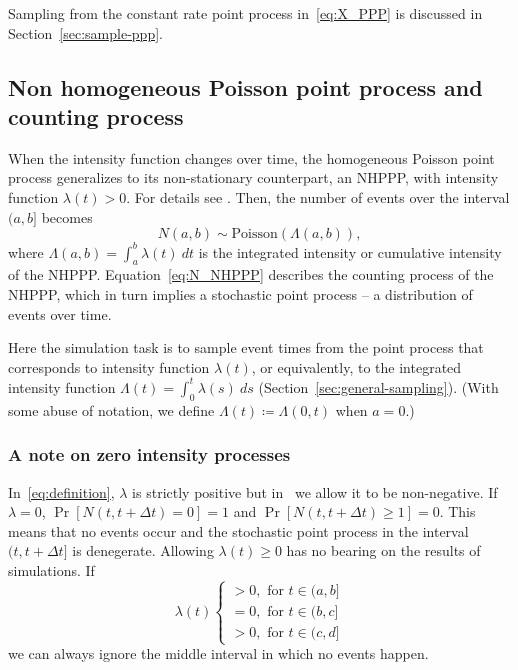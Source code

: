 \documentclass[article,nojss]{jss}\usepackage[]{graphicx}\usepackage[]{xcolor}
\begin{document}
Sampling from the constant rate point process in~\eqref{eq:X_PPP} is discussed in Section~\ref{sec:sample-ppp}.



\subsection{Non homogeneous Poisson point process and counting process}\label{sec:nhppp-intro}
When the intensity function changes over time, the homogeneous Poisson point process generalizes to its non-stationary counterpart, an NHPPP, with intensity function $\lambda(t) > 0$. For details see \citet[par 4.2]{cox1965theory}. Then, the number of events over the interval $(a, b]$ becomes
\begin{equation}\label{eq:N_NHPPP}
N(a, b) \sim \text{Poisson}(\Lambda(a, b)),
\end{equation}
where $\Lambda(a, b) = \int_a^b \lambda(t) \ dt$ is the integrated intensity or cumulative intensity of the NHPPP. Equation~\eqref{eq:N_NHPPP} describes the counting process of the NHPPP, which in turn implies a stochastic point process -- a distribution of events over time.

Here the simulation task is to sample event times from the point process that corresponds to intensity function $\lambda(t)$, or equivalently, to the integrated intensity function $\Lambda(t) = \int_0^t \lambda(s) \ ds$ (Section~\ref{sec:general-sampling}).
(With some abuse of notation, we define $\Lambda(t) \coloneqq \Lambda(0, t)$ when  $a=0$.)

\subsubsection{A note on zero intensity processes}
In~\eqref{eq:definition}, $\lambda$ is strictly positive but in~ we allow it to be non-negative. If $\lambda = 0$, ${\Pr[N(t, t + \Delta t) = 0] = 1}$ and ${\Pr[N(t, t + \Delta t) \ge 1] = 0}$. This means that no events occur and the stochastic point process in the interval $(t, t + \Delta t]$ is denegerate. Allowing $\lambda(t) \ge 0$ has no bearing on the results of simulations. If
\begin{equation*}
    \lambda(t)  \begin{cases}
    >0, \text{ for } t \in (a, b] \\
    =0, \text{ for } t \in (b, c] \\
    >0, \text{ for } t \in (c, d]
    \end{cases}
\end{equation*}
we can always ignore the middle interval in which no events happen.
\end{document}
